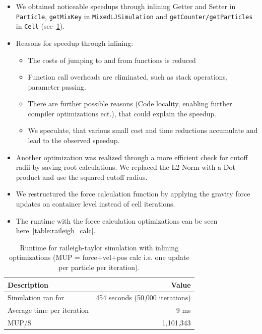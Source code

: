 \documentclass{article}
\begin{document}
    \begin{itemize}
        \item We obtained noticeable speedups through inlining Getter and Setter in \texttt{Particle}, \texttt{getMixKey} in \texttt{MixedLJSimulation} and \texttt{getCounter/getParticles} in \texttt{Cell} (see\ \ref{table:raileigh_inline}).
        \item Reasons for speedup through inlining:
        \begin{itemize}
            \item The costs of jumping to and from functions is reduced
            \item Function call overheads are eliminated, such as stack operations, parameter passing.
            \item There are further possible reasons (Code locality, enabling further compiler optimizations ect.), that could explain the speedup.
            \item We speculate, that various small cost and time reductions accumulate and lead to the observed speedup.
        \end{itemize}
        \item Another optimization was realized through a more efficient check for cutoff radii by saving root calculations. We replaced the L2-Norm with a Dot product and use the squared cutoff radius.
        \item We restructured the force calculation function by applying the gravity force updates on container level instead of cell iterations.
        \item The runtime with the force calculation optimizations can be seen here\ \ref{table:raileigh_calc}.
    \end{itemize}

\begin{table}[h!]
    \centering
    \begin{tabular}{|l|r|}
        \hline
        \textbf{Description} & \textbf{Value} \\ \hline
        Simulation ran for & 454 seconds (50,000 iterations) \\ \hline
        Average time per iteration & 9 ms \\ \hline
        MUP/S & 1,101,343 \\ \hline
    \end{tabular}
    \caption{Runtime for raileigh-taylor simulation with inlining optimizations (MUP = force+vel+pos calc i.e. one update per particle per iteration).}
    \label{table:raileigh_inline}
\end{table}
\end{document}

